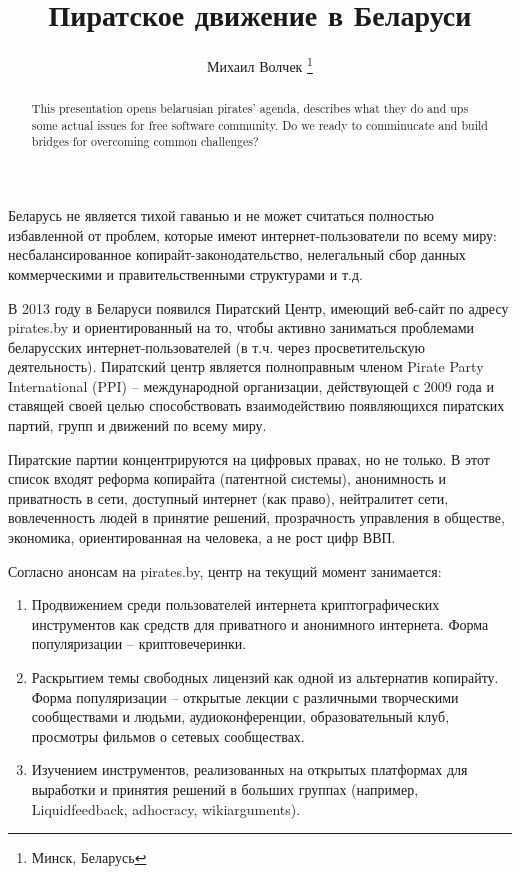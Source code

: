 \documentclass[10pt, a5paper]{article}
\begin{document}
\title{Пиратское движение в Беларуси}
\author{Михаил Волчек \footnote{Минск, Беларусь}}
\maketitle
\begin{abstract}
This presentation opens belarusian pirates' agenda, describes what they do and ups some actual issues for free software community. Do we ready to comminucate and build bridges for overcoming common challenges?
\end{abstract}
Беларусь не является тихой гаванью и не может считаться полностью избавленной от проблем, которые имеют интернет-пользователи по всему миру: несбалансированное копирайт-законодательство, нелегальный сбор данных коммерческими и правительственными структурами и т.д.

В 2013 году в Беларуси появился Пиратский Центр, имеющий веб-сайт по адресу pirates.by и ориентированный на то, чтобы активно заниматься проблемами беларусских интернет-пользователей (в т.ч. через просветительскую деятельность).
Пиратский центр является полноправным членом Pirate Party International (PPI) -- международной организации, действующей с 2009 года и ставящей своей целью способствовать взаимодействию появляющихся пиратских партий, групп и движений по всему миру.

Пиратские партии концентрируются на цифровых правах, но не только. В этот список входят реформа копирайта (патентной системы), анонимность и приватность в сети, доступный интернет (как право), нейтралитет сети, вовлеченность людей в принятие решений, прозрачность управления в обществе, экономика, ориентированная на человека, а не рост цифр ВВП.

Согласно анонсам на pirates.by, центр на текущий момент занимается:

\begin{enumerate}
  \item Продвижением среди пользователей интернета криптографических
инструментов как средств для приватного и анонимного интернета. Форма популяризации -- криптовечеринки.
  \item Раскрытием темы свободных лицензий как одной из альтернатив копирайту. Форма популяризации -- открытые лекции с различными творческими сообществами и людьми, аудиоконференции, образовательный клуб, просмотры фильмов о сетевых сообществах.
  \item Изучением инструментов, реализованных на открытых платформах для
выработки и принятия решений в больших группах (например,
Liquidfeedback, adhocracy, wikiarguments).
\end{enumerate}
\end{document}
